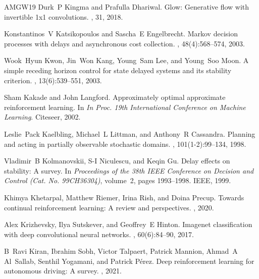 \begin{thebibliography}{AMGW{\etalchar{+}}19}
Durk~P Kingma and Prafulla Dhariwal.
\newblock Glow: Generative flow with invertible 1x1 convolutions.
, 31, 2018.

Konstantinos~V Katsikopoulos and Sascha~E Engelbrecht.
\newblock Markov decision processes with delays and asynchronous cost collection.
, 48(4):568--574, 2003.

Wook~Hyun Kwon, Jin~Won Kang, Young~Sam Lee, and Young~Soo Moon.
\newblock A simple receding horizon control for state delayed systems and its stability criterion.
, 13(6):539--551, 2003.

Sham Kakade and John Langford.
\newblock Approximately optimal approximate reinforcement learning.
\newblock In {\em In Proc. 19th International Conference on Machine Learning}. Citeseer, 2002.

Leslie~Pack Kaelbling, Michael~L Littman, and Anthony~R Cassandra.
\newblock Planning and acting in partially observable stochastic domains.
, 101(1-2):99--134, 1998.

Vladimir~B Kolmanovskii, S-I Niculescu, and Keqin Gu.
\newblock Delay effects on stability: A survey.
\newblock In {\em Proceedings of the 38th IEEE Conference on Decision and Control (Cat. No. 99CH36304)}, volume~2, pages 1993--1998. IEEE, 1999.

Khimya Khetarpal, Matthew Riemer, Irina Rish, and Doina Precup.
\newblock Towards continual reinforcement learning: A review and perspectives.
, 2020.

Alex Krizhevsky, Ilya Sutskever, and Geoffrey~E Hinton.
\newblock Imagenet classification with deep convolutional neural networks.
, 60(6):84--90, 2017.

B~Ravi Kiran, Ibrahim Sobh, Victor Talpaert, Patrick Mannion, Ahmad~A Al~Sallab, Senthil Yogamani, and Patrick P{\'e}rez.
\newblock Deep reinforcement learning for autonomous driving: A survey.
, 2021.


\end{thebibliography}
